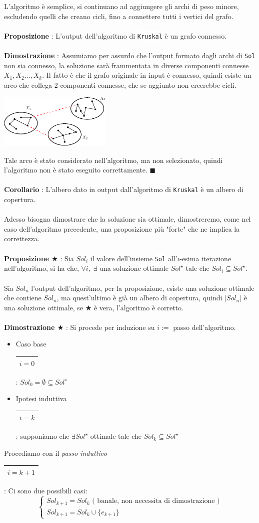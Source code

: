 \documentclass[12pt, letterpaper]{article}
\newcommand{\codee}[1]{\colorbox{white}{\texttt{#1}}}
\newcommand{\acc}{\\\hphantom{}\\}
\newcommand{\boxedMath}[1]{\begin{tabular}{|c|}\hline \texttt{#1} \\ \hline\end{tabular} :}
\begin{document}
L'algoritmo è semplice, si continuano ad aggiungere gli archi di peso minore, escludendo quelli che creano cicli, fino 
a connettere tutti i vertici del grafo.\acc 
\textbf{Proposizione} : L'output dell'algoritmo di \codee{Kruskal} è un grafo connesso.\acc 
\textbf{Dimostrazione} : Assumiamo per assurdo che l'output formato dagli archi di \codee{Sol} non sia connesso, 
la soluzione sarà frammentata in diverse componenti connesse $X_1,X_2\dots,X_k$. Il fatto è che il grafo originale in input è connesso, quindi 
esiste un arco che collega 2 componenti connesse, che se aggiunto non creerebbe cicli.
\begin{center}
    \includegraphics[width=0.4\textwidth ]{images/propMST.eps}
\end{center}
 Tale arco è stato considerato nell'algoritmo, 
ma non selezionato, quindi l'algoritmo non è stato eseguito correttamente. $\blacksquare$\acc
\textbf{Corollario} : L'albero dato in output dall'algoritmo di  \codee{Kruskal} è un albero di copertura.\acc 
Adesso bisogna dimostrare che la soluzione sia ottimale, dimostreremo, come nel caso dell'algoritmo precedente, una proposizione 
più "forte" che ne implica la correttezza.\acc 
\textbf{Proposizione $\bigstar$} : Sia $Sol_i$ il valore dell'insieme \codee{Sol} all'$i$-esima iterazione nell'algoritmo, 
si ha che, $\forall i,\; \exists $ una soluzione ottimale $Sol^\star$ tale che $Sol_i\subseteq Sol^\star$.\acc 
Sia $Sol_n$ l'output dell'algoritmo, per la proposizione, esiste una soluzione ottimale che contiene $Sol_n$, ma quest'ultimo 
è già un albero di copertura, quindi $|Sol_n|$ è una soluzione ottimale, se $\bigstar$ è vera, l'algoritmo è corretto.\acc 
\textbf{Dimostrazione $\bigstar$} :  Si procede per induzione su $i :=$ passo dell'algoritmo.\begin{itemize}
    \item Caso base \boxedMath{$i=0$} $Sol_0 = \emptyset \subseteq Sol^\star$ 
    \item Ipotesi induttiva  \boxedMath{$i=k$} supponiamo che $\exists Sol^\star$ ottimale tale che $Sol_k\subseteq Sol^\star$
\end{itemize}
Procediamo con il \textit{passo induttivo} \boxedMath{$i=k+1$} Ci sono due possibili casi:
 $$\begin{cases}
    Sol_{k+1}=Sol_k \text{ ( banale, non necessita di dimostrazione )}\\ 
    Sol_{k+1}=Sol_k \cup \{e_{k+1}\}
\end{cases}$$ 
\end{document}
